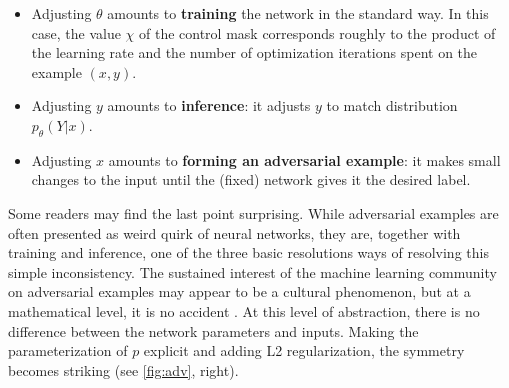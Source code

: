 \documentclass[twoside]{article}
\let\cite\citep
\theoremstyle{plain}
\theoremstyle{definition}
\theoremstyle{remark}
\begin{document}
\begin{itemize}[nosep,itemsep=3pt, left=0.5em]
   \item Adjusting $\theta$
   amounts to \textbf{training} the network in the standard way.
       In this case, the value $\chi$ of the control mask corresponds roughly
       to the product of the learning rate and the number of optimization iterations spent on the example $(x,y)$.

   \item Adjusting $y$
   amounts to \textbf{inference}:
   it adjusts $y$ to match distribution $p_\theta(Y|x)$.

   \item Adjusting $x$
   amounts to \textbf{forming an adversarial example}: it makes small changes to the input
   until the (fixed) network gives it the desired label.
\end{itemize}

Some readers may find the last point surprising. 
While adversarial examples \citep{goodfellow2014explaining} are often presented as weird quirk of neural networks,
   they are, together with training and inference, one of the three basic resolutions ways of resolving this simple inconsistency.
% 
The sustained interest of the machine learning community on adversarial examples
   may appear to be a cultural phenomenon,
   but at a mathematical level, it is no accident \citep{shafahi2018adversarial}.
At this level of abstraction, there is no difference between
   the network parameters and inputs.
Making the parameterization of $p$ explicit and adding L2 regularization,
the symmetry
becomes striking (see \cref{fig:adv}, right).
\end{document}
